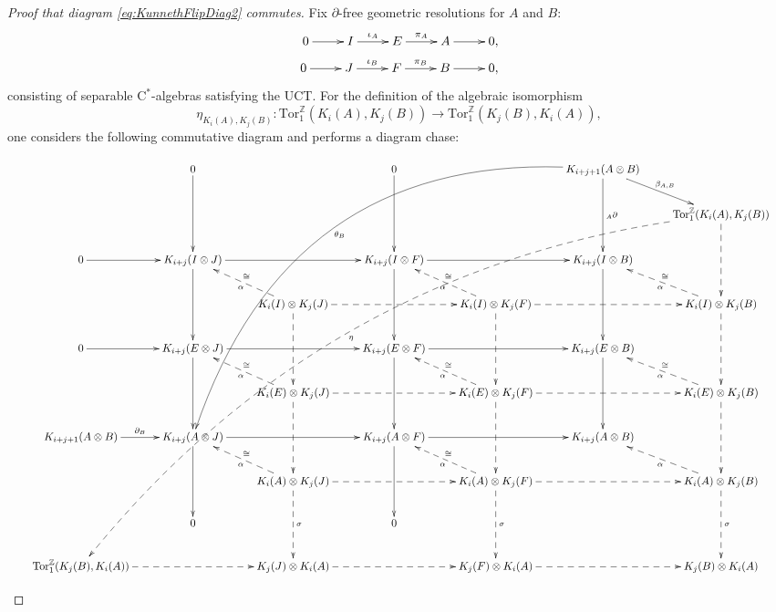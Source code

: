 \documentclass[a4paper,10pt]{amsart}
\newcommand{\cstar}{\ensuremath{\mathrm C^\ast}}
\numberwithin{equation}{section}
\numberwithin{theorem}{section}
\newcommand{\Z}{\mathbb{Z}}
\newcommand{\Tor}{\mathrm{Tor}_1^{\Z}}
\begin{document}
\begin{proof}[Proof that diagram \eqref{eq:KunnethFlipDiag2} commutes]
Fix $\partial$-free geometric resolutions for $A$ and $B$:
	\begin{align*}
		\xymatrix{
			0 \ar[r] & I \ar[r]^-{\iota_A} & E \ar[r]^-{\pi_A} & A \ar[r] & 0 ,
		}  \\ 
		\xymatrix{
			0 \ar[r] & J \ar[r]^-{\iota_B} & F \ar[r]^-{\pi_B} & B \ar[r] & 0 ,
		} 
	\end{align*}
	consisting of separable $\cstar$-algebras satisfying the UCT. For the definition of the algebraic isomorphism
	 $$
	 	\eta_{K_i(A),K_j(B)} \colon \Tor(K_i(A),K_j(B)) \to \Tor(K_j(B),K_i(A)),
	 $$ one considers the following commutative diagram and performs a diagram chase:
	 
	 \begin{landscape}
	 \[
	\resizebox{1.7\textwidth}{!}{
	 	\xymatrix{
	 		& 0 \ar[dd] & & 0  \ar[dd]  & & K_{i+j+1}(A \otimes B) \ar@/_9em/@{->}[ddddddllll]^-{\theta_B} \ar[dd]^-{{}_A \partial} \ar[dr]^-{\beta_{A,B}} & \\ 
	 	  	& & & & & &  \ar@/_7em/@{-->}[ddddddddllllll]^-{\eta}\Tor(K_i(A),K_j(B)) \ar@{-->}[dd]  \\
	 		0 \ar[r] & K_{i+j}(I \otimes J) \ar[dd] \ar[rr] & & K_{i+j}(I \otimes F) \ar[dd] \ar[rr] & & K_{i+j}(I \otimes B) \ar[dd] \\
	 		& & K_i(I) \otimes K_j(J) \ar@{-->}[ul]^-{\alpha}_-\cong \ar@{-->}[rr] \ar@{-->}[dd] & & K_i(I) \otimes K_j(F) \ar@{-->}[ul]^-\alpha_-\cong \ar@{-->}[rr] \ar@{-->}[dd] & & K_i(I) \otimes K_j(B) \ar@{-->}[ul]^-\alpha_-\cong \ar@{-->}[dd] \\
	 		0 \ar[r]	& K_{i+j}(E \otimes J) \ar[rr] \ar[dd] & & K_{i+j}(E \otimes F)  \ar[rr] \ar[dd]  &  & K_{i+j}(E \otimes B) \ar[dd]  \\
	 		& & K_i(E) \otimes K_j(J) \ar@{-->}[dd] \ar@{-->}[rr] \ar@{-->}[ul]^-{\alpha}_-\cong & & K_i(E) \otimes K_j(F) \ar@{-->}[rr] \ar@{-->}[dd]  \ar@{-->}[ul]^-{\alpha}_-\cong & & K_i(E) \otimes K_j(B)  \ar@{-->}[dd] \ar@{-->}[ul]^-{\alpha}_-\cong \\
	 	K_{i+j+1}(A \otimes B) \ar[r]^-{\partial_B}	& K_{i+j}(A \otimes J) \ar[dd]  \ar[rr] && K_{i+j}(A \otimes F) \ar[dd] \ar[rr] & & K_{i+j}(A \otimes B) \\
	 		& & K_i(A) \otimes K_j(J)  \ar@{-->}[rr] \ar@{-->}[dd]^-\sigma \ar@{-->}[ul]^-{\alpha}_-\cong && K_i(A) \otimes K_j(F) \ar@{-->}[dd]^-\sigma  \ar@{-->}[rr] \ar@{-->}[ul]^-{\alpha}_-\cong && K_i(A) \otimes K_j(B) \ar@{-->}[ul]^-{\alpha} \ar@{-->}[dd]^-\sigma \\ 
	 		&  0 & & 0 
	 		\\ 
	 	\Tor(K_j(B),K_i(A)) \ar@{-->}[rr]	& & K_j(J) \otimes K_i(A)  \ar@{-->}[rr] & & K_j(F) \otimes K_i(A) \ar@{-->}[rr] & & K_j(B) \otimes K_i(A) 
	 	}
	 }
	\]
	

\end{landscape}
\end{proof}
\end{document}
